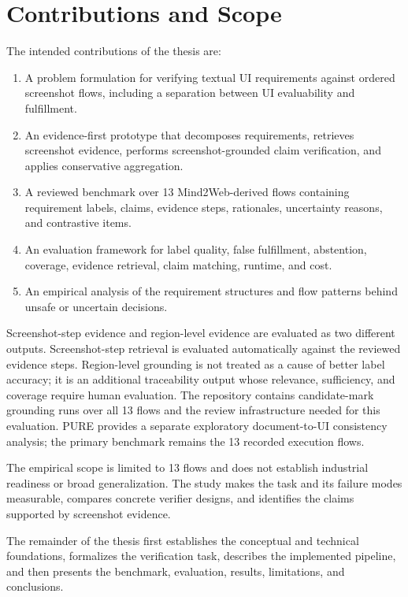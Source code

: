 \section{Contributions and Scope}\label{contributions-and-scope}

The intended contributions of the thesis are:

\begin{enumerate}
\def\labelenumi{\arabic{enumi}.}
\tightlist
\item
  A problem formulation for verifying textual UI requirements against ordered
  screenshot flows, including a separation between UI evaluability and
  fulfillment.
\item
  An evidence-first prototype that decomposes requirements, retrieves
  screenshot evidence, performs screenshot-grounded claim verification, and
  applies conservative aggregation.
\item
  A reviewed benchmark over 13 Mind2Web-derived flows containing requirement
  labels, claims, evidence steps, rationales, uncertainty reasons, and
  contrastive items.
\item
  An evaluation framework for label quality, false fulfillment, abstention,
  coverage, evidence retrieval, claim matching, runtime, and cost.
\item
  An empirical analysis of the requirement structures and flow patterns behind
  unsafe or uncertain decisions.
\end{enumerate}

Screenshot-step evidence and region-level evidence are evaluated as two
different outputs. Screenshot-step retrieval is evaluated automatically against
the reviewed evidence steps. Region-level grounding is not treated as a cause of
better label accuracy; it is an additional traceability output whose relevance,
sufficiency, and coverage require human evaluation. The repository contains
candidate-mark grounding runs over all 13 flows and the review infrastructure
needed for this evaluation. PURE provides a separate exploratory
document-to-UI consistency analysis; the primary benchmark remains the 13
recorded execution flows.

The empirical scope is limited to 13 flows and does not establish industrial
readiness or broad generalization. The study makes the task and its failure
modes measurable, compares concrete verifier designs, and identifies the claims
supported by screenshot evidence.

The remainder of the thesis first establishes the conceptual and technical
foundations, formalizes the verification task, describes the implemented
pipeline, and then presents the benchmark, evaluation, results, limitations, and
conclusions.
